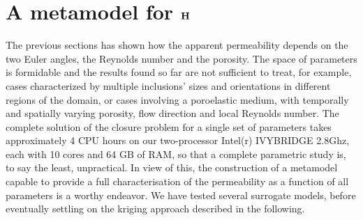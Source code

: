 \section{A metamodel for $\bf H$}

The previous sections has shown how the apparent permeability depends on  the two Euler angles, the Reynolds number and the porosity. The space 
of parameters is formidable and the results found so far are not sufficient to treat, for example, cases characterized by multiple inclusions'
sizes and orientations in different regions of the domain, or cases involving a poroelastic medium, with temporally and spatially varying 
porosity, flow direction and local Reynolds number. The complete solution of the closure problem for a single set of parameters takes 
approximately 4 CPU hours on our two-processor Intel(r) IVYBRIDGE 2.8Ghz, each with 10 cores and 64 GB of RAM, so that a complete parametric 
study is, to say the least, unpractical. In view of this, the construction of a metamodel capable to provide a full characterisation of the 
permeability as a function of all parameters is a worthy endeavor. We have tested several surrogate models, before eventually settling on the kriging 
approach \citet{Kleijnen20171} described in the following.





%


